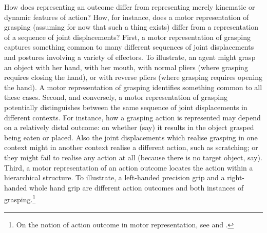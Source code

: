 \documentclass[12pt,\papersize]{extarticle}
\begin{document}
How does representing an outcome differ from representing merely kinematic or dynamic features of action? How, for instance, does a motor representation of grasping (assuming for now that such a thing exists) differ from a representation of a sequence of joint displacements? First, a motor representation of grasping captures something common to many different sequences of joint displacements and postures involving a variety of effectors. To illustrate, an agent might grasp an object with her hand, with her mouth, with normal pliers (where grasping requires closing the hand), or with reverse pliers (where grasping requires opening the hand). A motor representation of grasping identifies something common to all these cases. Second, and conversely, a motor representation of grasping potentially distinguishes between the same sequence of joint displacements in different contexts. For instance, how a grasping action is represented may depend on a relatively distal outcome: on whether (say) it results in the object grasped being eaten or placed. Also the joint displacements which realise grasping in one context might in another context realise a different action, such as scratching; or they might fail to realise any action at all (because there is no target object, say). Third, a motor representation of an action outcome locates the action within a hierarchical structure. To illustrate, a left-handed precision grip and a right-handed whole hand grip are different action outcomes and both instances of grasping.\footnote{ On the notion of action outcome in motor representation, see \citet{jeannerod_motor_2006} and \citet{rizzolatti_mirrors_2008}.}  
\end{document}
